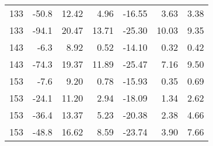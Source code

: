 \begin{table}[H]
\begin{tabular}{|r|r|r|r|r|r|r|}
           133 &      -50.8 &      12.42 &       4.96 &     -16.55 &       3.63 &       3.38 \\
    
           133 &      -94.1 &      20.47 &      13.71 &     -25.30 &      10.03 &       9.35 \\
    \hline
           143 &       -6.3 &       8.92 &       0.52 &     -14.10 &       0.32 &       0.42 \\
    
           143 &      -74.3 &      19.37 &      11.89 &     -25.47 &       7.16 &       9.50 \\
    \hline
           153 &       -7.6 &       9.20 &       0.78 &     -15.93 &       0.35 &       0.69 \\
    
           153 &      -24.1 &      11.20 &       2.94 &     -18.09 &       1.34 &       2.62 \\
    
           153 &      -36.4 &      13.37 &       5.23 &     -20.38 &       2.38 &       4.66 \\
    
           153 &      -48.8 &      16.62 &       8.59 &     -23.74 &       3.90 &       7.66 \\
    \hline
    \end{tabular}  
    \label{tab: zweiter Quadrant1} 
\end{table}
\newpage
